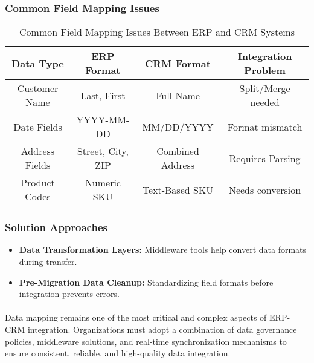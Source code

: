 \subsubsection{Common Field Mapping Issues}
\begin{center}
    \begin{table}[h]
        \centering

        \begin{tabular}{|c|c|c|c|}
            \hline
            \textbf{Data Type} & \textbf{ERP Format} & \textbf{CRM Format} & \textbf{Integration Problem} \\
            \hline
            Customer Name & Last, First & Full Name & Split/Merge needed \\
            \hline
            Date Fields & YYYY-MM-DD & MM/DD/YYYY & Format mismatch \\
            \hline
            Address Fields & Street, City, ZIP & Combined Address & Requires Parsing \\
            \hline
            Product Codes & Numeric SKU & Text-Based SKU & Needs conversion \\
            \hline
        \end{tabular}
        \label{tab:field_mapping_issues}
        \caption{Common Field Mapping Issues Between ERP and CRM Systems}
    \end{table}
\end{center}

\subsubsection{Solution Approaches}
\begin{itemize}
    \item \textbf{Data Transformation Layers:} Middleware tools help convert data formats during transfer.
    \item \textbf{Pre-Migration Data Cleanup:} Standardizing field formats before integration prevents errors.
\end{itemize}

\paragraph{}
Data mapping remains one of the most critical and complex aspects of ERP-CRM integration. Organizations must adopt a combination of data governance policies, middleware solutions, and real-time synchronization mechanisms to ensure consistent, reliable, and high-quality data integration.

